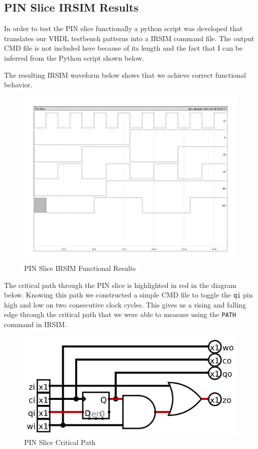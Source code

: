     \subsection{PIN Slice IRSIM Results}

        In order to test the PIN slice functionally a python script was
        developed that translates our VHDL testbench patterns into a IRSIM
        command file. The output CMD file is not included here because of its
        length and the fact that I can be inferred from the Python script shown
        below.

        

        The resulting IRSIM waveform below shows that we achieve correct
        functional behavior.

        \begin{figure}[H]
            \centering
            \includegraphics[width=0.75\linewidth]{../../irsim/pin_slice.png}
            \caption{PIN Slice IRSIM Functional Results}
        \end{figure}

        \newpage

        The critical path through the PIN slice is highlighted in red in the
        diagram below. Knowing this path we constructed a simple CMD file to
        toggle the \texttt{qi} pin high and low on two consecutive clock
        cycles. This gives us a rising and falling edge through the critical
        path that we were able to measure using the \texttt{PATH} command in
        IRSIM. 

        \begin{figure}[H]
            \centering
            \includegraphics[width=0.75\linewidth]{../../logisim/pin_slice_crit_path.png}
            \caption{PIN Slice Critical Path}
        \end{figure}

